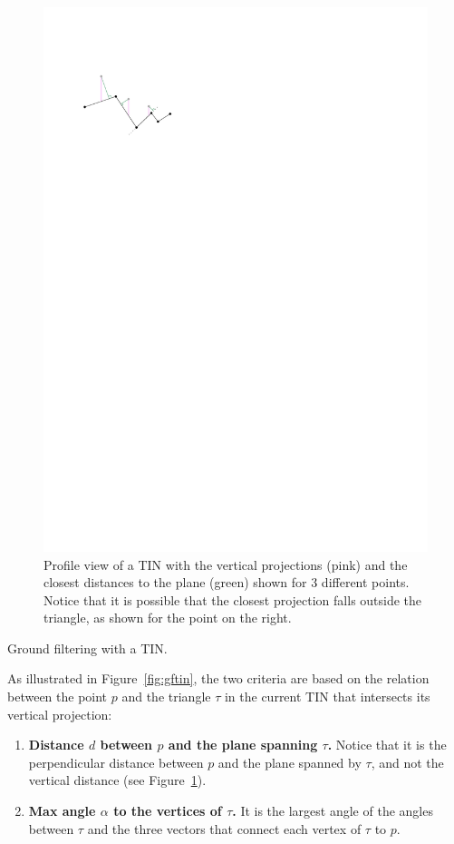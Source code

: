 \begin{marginfigure}
\begin{subfigure}[b]{\linewidth}
    \centering
    \includegraphics[width=\textwidth]{gftin_projection.pdf}
    \caption{Profile view of a TIN with the vertical projections (pink) and the closest distances to the plane (green) shown for 3 different points. Notice that it is possible that the closest projection falls outside the triangle, as shown for the point on the right.}\label{fig:gftin_projection}
  \end{subfigure}
  \caption{Ground filtering with a TIN\@.}%
\label{fig:gftin}
\end{marginfigure}
As illustrated in Figure~\ref{fig:gftin}, the two criteria are based on the relation between the point $p$ and the triangle $\tau$ in the current TIN that intersects its vertical projection:
\begin{enumerate}
  \item \textbf{Distance $d$ between $p$ and the plane spanning $\tau$.} Notice that it is the perpendicular distance between $p$ and the plane spanned by $\tau$, and not the vertical distance (see Figure~\ref{fig:gftin_projection}).
  \item \textbf{Max angle $\alpha$ to the vertices of $\tau$.} It is the largest angle of the angles between $\tau$ and the three vectors that connect each vertex of $\tau$ to $p$. 
\end{enumerate}

